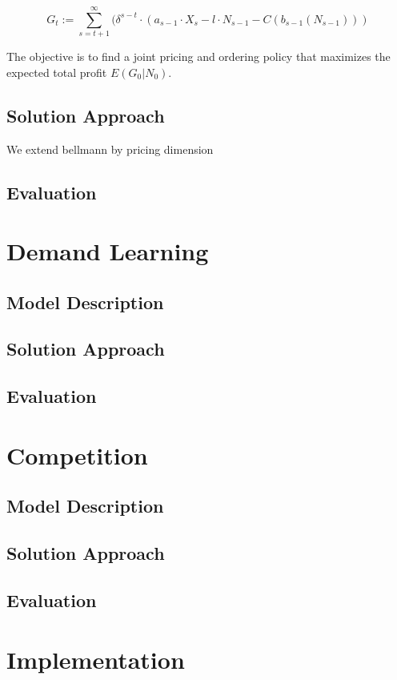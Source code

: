 $$
G_t := \sum_{s=t+1}^{\infty} (\delta^{s-t} \cdot (a_{s-1} \cdot X_s - l \cdot N_{s-1} - C(b_{s-1}(N_{s-1})))
$$

The objective is to find a joint pricing and ordering policy that maximizes the expected total profit $E(G_0 | N_0)$.

\subsection{Solution Approach}
We extend bellmann by pricing dimension

\subsection{Evaluation}


\section{Demand Learning}
\subsection{Model Description}
\subsection{Solution Approach}
\subsection{Evaluation}

\section{Competition}
\subsection{Model Description}
\subsection{Solution Approach}
\subsection{Evaluation}

\section{Implementation}
